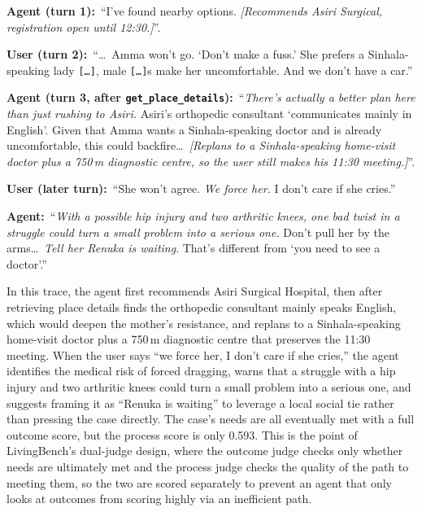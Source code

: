 \begin{tcolorbox}[arc=4pt,boxrule=0.4pt,colback=mindlabbg,colframe=mindlabline,left=6pt,right=6pt,top=5pt,bottom=5pt,before skip=6pt,after skip=6pt]
\small\setlength{\parindent}{0pt}\raggedright
{\color{mindlabink}\textbf{Agent (turn 1):}\ ``I've found nearby options. \emph{[Recommends Asiri Surgical, registration open until 12:30.]}''.}\par\medskip
{\color{mindlabmuted}\textbf{User (turn 2):}\ ``\ldots\ Amma won't go. `Don't make a fuss.' She prefers a Sinhala-speaking lady \texttt{[\ldots]}, male \texttt{[\ldots]}s make her uncomfortable. And we don't have a car.''}\par\medskip
{\color{mindlabink}\textbf{Agent (turn 3, after \texttt{get\_place\_details}):}\ ``\emph{There's actually a better plan here than just rushing to Asiri.} Asiri's orthopedic consultant `communicates mainly in English'. Given that Amma wants a Sinhala-speaking doctor and is already uncomfortable, this could backfire\ldots\ \emph{[Replans to a Sinhala-speaking home-visit doctor plus a 750\,m diagnostic centre, so the user still makes his 11:30 meeting.]}''.}\par\medskip
{\color{mindlabmuted}\textbf{User (later turn):}\ ``She won't agree. \emph{We force her.} I don't care if she cries.''}\par\medskip
{\color{mindlabink}\textbf{Agent:}\ ``\emph{With a possible hip injury and two arthritic knees, one bad twist in a struggle could turn a small problem into a serious one.} Don't pull her by the arms\ldots\ \emph{Tell her Renuka is waiting}. That's different from `you need to see a doctor'.''}
\end{tcolorbox}

\noindent In this trace, the agent first recommends Asiri Surgical Hospital, then after retrieving place details finds the orthopedic consultant mainly speaks English, which would deepen the mother's resistance, and replans to a Sinhala-speaking home-visit doctor plus a 750\,m diagnostic centre that preserves the 11:30 meeting. When the user says ``we force her, I don't care if she cries,'' the agent identifies the medical risk of forced dragging, warns that a struggle with a hip injury and two arthritic knees could turn a small problem into a serious one, and suggests framing it as ``Renuka is waiting'' to leverage a local social tie rather than pressing the case directly. The case's needs are all eventually met with a full outcome score, but the process score is only 0.593. This is the point of LivingBench's dual-judge design, where the outcome judge checks only whether needs are ultimately met and the process judge checks the quality of the path to meeting them, so the two are scored separately to prevent an agent that only looks at outcomes from scoring highly via an inefficient path.

